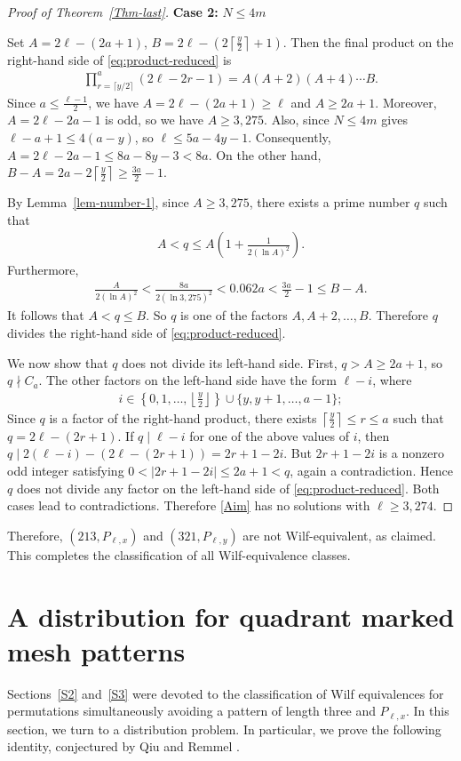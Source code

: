 \documentclass[11pt]{article}
\begin{document}
\begin{proof}[Proof of Theorem~\ref{Thm-last}]
\noindent \textbf{Case 2:} $N\le4m$

Set $A=2\ell-(2a+1)$, $B=2\ell-
\left(2\left\lceil\frac{y}{2}\right\rceil+1\right)$.
Then the final product on the right-hand side of
\eqref{eq:product-reduced} is
\begin{align*}
\prod_{r=\lceil y/2\rceil}^{a}(2\ell-2r-1)
=
A(A+2)(A+4)\cdots B.
\end{align*}
Since $a\le\frac{\ell-1}{2}$, 
we have $A=2\ell-(2a+1)\ge\ell$ and $A\ge2a+1$.
Moreover, $A=2\ell-2a-1$ is odd, so we have $A\ge 3{,}275$.
Also, since $N\le4m$ gives $\ell-a+1\le4(a-y)$,
so $\ell\le5a-4y-1$.
Consequently, $A=2\ell-2a-1
\le8a-8y-3<8a$.
On the other hand,
$B-A=2a-2\left\lceil\frac{y}{2}\right\rceil\ge\frac{3a}{2}-1$.

By Lemma~\ref{lem-number-1}, since $A\ge3{,}275$, there exists a prime number $q$
such that
\begin{align*}
A<q\le
A\left(1+\frac{1}{2(\ln A)^2}\right).    
\end{align*}
Furthermore,
\begin{align*}
\frac{A}{2(\ln A)^2}
<
\frac{8a}{2(\ln3{,}275)^2}<0.062a<\frac{3a}{2}-1\le B-A.
\end{align*}
It follows that $A<q\le B$.
So $q$ is one of the factors $A,A+2,\ldots,B$.
Therefore $q$ divides the right-hand side of
\eqref{eq:product-reduced}.

We now show that \(q\) does not divide its left-hand side. First,
$q>A\ge2a+1$,
so $q\nmid C_a$.
The other factors on the left-hand side have the form $\ell-i$,
where
\begin{align*}
i\in
\left\{0,1,\ldots,\left\lfloor\frac{y}{2}\right\rfloor\right\}
\cup
\{y,y+1,\ldots,a-1\};    
\end{align*}
Since $q$ is a factor of the right-hand product, there exists
$\left\lceil\frac{y}{2}\right\rceil\le r\le a$ such that $q=2\ell-(2r+1)$.
If \(q\mid\ell-i\) for one of the above values of \(i\), then
$q\mid
2(\ell-i)-(2\ell-(2r+1))
=
2r+1-2i$.
But $2r+1-2i$ is a nonzero odd integer satisfying
$0<|2r+1-2i|\le2a+1<q$,
again a contradiction. Hence $q$ does not divide any factor on
the left-hand side of \eqref{eq:product-reduced}.
Both cases lead to contradictions. Therefore
\eqref{Aim} has no solutions with
$\ell\ge 3{,}274$.
\end{proof}
Therefore, $(213,P_{\ell,x})$ and $(321,P_{\ell,y})$ are not
Wilf-equivalent, as claimed. This completes the classification of all
Wilf-equivalence classes.


\section{A distribution for quadrant marked mesh patterns}\label{S4}
Sections~\ref{S2} and~\ref{S3} were devoted to the classification of
Wilf equivalences for permutations simultaneously avoiding a pattern of
length three and $P_{\ell,x}$. In this section, we turn to a distribution
problem. In particular, we prove the following identity, conjectured by
Qiu and Remmel \cite{QiuRemmel2018}.
\end{document}

